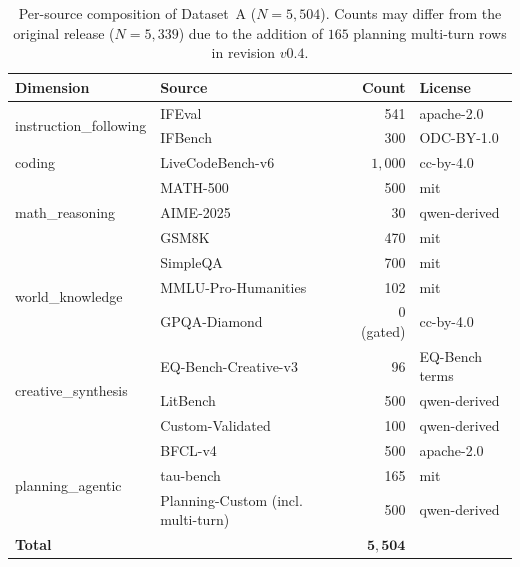 \documentclass[twocolumn,10pt,a4paper]{article}
\begin{document}
\begin{table}[!t]
\centering
\small
\caption{Per-source composition of Dataset~A ($N{=}5{,}504$). Counts may differ from the original release ($N{=}5{,}339$) due to the addition of $165$ planning multi-turn rows in revision $v0.4$.}
\label{tab:composition}
\begin{tabular}{l l r l}
\toprule
\textbf{Dimension} & \textbf{Source} & \textbf{Count} & \textbf{License} \\
\midrule
\multirow{2}{*}{instruction\_following}
  & IFEval~\cite{zhou2023ifeval}                & 541       & apache-2.0     \\
  & IFBench~\cite{pyatkin2025ifbench}           & 300       & ODC-BY-1.0     \\
\midrule
coding
  & LiveCodeBench-v6~\cite{jain2024livecodebench} & $1{,}000$ & cc-by-4.0      \\
\midrule
\multirow{3}{*}{math\_reasoning}
  & MATH-500~\cite{hendrycks2021math}            & 500       & mit            \\
  & AIME-2025                                    & 30        & qwen-derived   \\
  & GSM8K~\cite{cobbe2021gsm8k}                  & 470       & mit            \\
\midrule
\multirow{3}{*}{world\_knowledge}
  & SimpleQA~\cite{wei2024simpleqa}              & 700       & mit            \\
  & MMLU-Pro-Humanities~\cite{wang2024mmlupro}   & 102       & mit            \\
  & GPQA-Diamond~\cite{rein2024gpqa}             & 0 (gated) & cc-by-4.0      \\
\midrule
\multirow{3}{*}{creative\_synthesis}
  & EQ-Bench-Creative-v3~\cite{paech2024eqbench} & 96        & EQ-Bench terms \\
  & LitBench~\cite{stanford2025litbench}         & 500       & qwen-derived   \\
  & Custom-Validated                             & 100       & qwen-derived   \\
\midrule
\multirow{3}{*}{planning\_agentic}
  & BFCL-v4~\cite{yan2024bfcl}                   & 500       & apache-2.0     \\
  & tau-bench~\cite{yao2024taubench}             & 165       & mit            \\
  & Planning-Custom (incl. multi-turn)           & 500       & qwen-derived   \\
\midrule
\multicolumn{2}{l}{\textbf{Total}} & $\mathbf{5{,}504}$ & \\
\bottomrule
\end{tabular}
\end{table}
\end{document}
